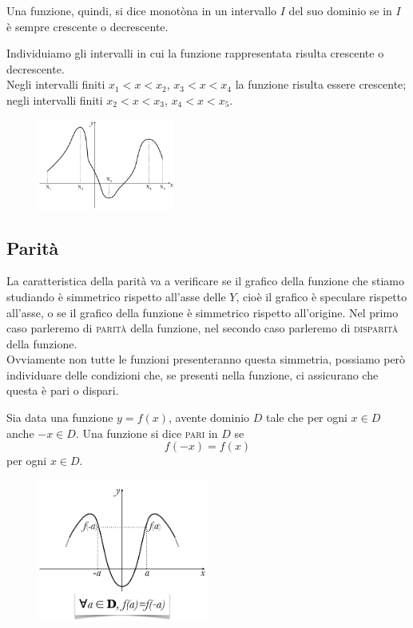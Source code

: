 Una funzione, quindi, si dice monotòna in un intervallo $I$ del suo dominio 
se in $I$ è sempre crescente o decrescente.\\

\begin{esempio}
Individuiamo gli intervalli in cui la funzione rappresentata risulta 
crescente o decrescente.\\
Negli intervalli finiti $x_1<x<x_2$, $x_3<x<x_4$ la funzione risulta essere 
crescente; negli intervalli finiti $x_2<x<x_3$, $x_4<x<x_5$.
% 
\begin{figure}[htpb!]
  \centering
  \includegraphics[width=0.4\textwidth]{img/funz_8.png}
\end{figure}
\end{esempio}
\subsection{Parità}
La caratteristica della parità va a verificare se il grafico della funzione 
che stiamo studiando è simmetrico rispetto all'asse delle $Y$, cioè il 
grafico è speculare rispetto all'asse, o se il grafico della funzione è 
simmetrico rispetto all'origine. Nel primo caso parleremo di \textsc{parità} 
della funzione, nel secondo caso parleremo di \textsc{disparità} della 
funzione.\\

Ovviamente non tutte le funzioni presenteranno questa simmetria, possiamo 
però individuare delle condizioni che, se presenti nella funzione, ci 
assicurano che questa è pari o dispari.\\

\begin{definizione}
Sia data una funzione $y=f(x)$, avente dominio $D$ tale che per ogni $x\in D$ 
anche $-x\in D$. Una funzione si dice \textsc{pari} in $D$ se \\
$$f(-x)=f(x)$$
per ogni $x\in D$.
\end{definizione}

\begin{figure}[htpb!]
  \centering
  \includegraphics[width=0.5\textwidth]{img/funz_9.png}
\end{figure}
%

